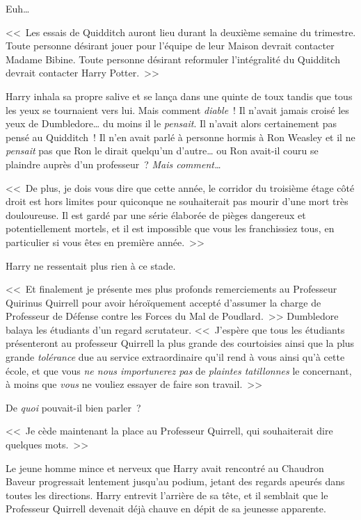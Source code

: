 Euh…

<<~Les essais de Quidditch auront lieu durant la deuxième semaine du trimestre. Toute personne désirant jouer pour l'équipe de leur Maison devrait contacter Madame Bibine. Toute personne désirant reformuler l'intégralité du Quidditch devrait contacter Harry Potter.~>>

Harry inhala sa propre salive et se lança dans une quinte de toux tandis que tous les yeux se tournaient vers lui. Mais comment \emph{diable}~! Il n'avait jamais croisé les yeux de Dumbledore… du moins il le \emph{pensait}. Il n'avait alors certainement pas pensé au Quidditch~! Il n'en avait parlé à personne hormis à Ron Weasley et il ne \emph{pensait} pas que Ron le dirait quelqu'un d'autre… ou Ron avait-il couru se plaindre auprès d'un professeur~? \emph{Mais comment…}

<<~De plus, je dois vous dire que cette année, le corridor du troisième étage côté droit est hors limites pour quiconque ne souhaiterait pas mourir d'une mort très douloureuse. Il est gardé par une série élaborée de pièges dangereux et potentiellement mortels, et il est impossible que vous les franchissiez tous, en particulier si vous êtes en première année.~>>

Harry ne ressentait plus rien à ce stade.

<<~Et finalement je présente mes plus profonds remerciements au Professeur Quirinus Quirrell pour avoir héroïquement accepté d'assumer la charge de Professeur de Défense contre les Forces du Mal de Poudlard.~>> Dumbledore balaya les étudiants d'un regard scrutateur. <<~J'espère que tous les étudiants présenteront au professeur Quirrell la plus grande des courtoisies ainsi que la plus grande \emph{tolérance} due au service extraordinaire qu'il rend à vous ainsi qu'à cette école, et que vous \emph{ne nous importunerez pas} de \emph{plaintes tatillonnes} le concernant, à moins que \emph{vous} ne vouliez essayer de faire son travail.~>>

De \emph{quoi} pouvait-il bien parler~?

<<~Je cède maintenant la place au Professeur Quirrell, qui souhaiterait dire quelques mots.~>>

Le jeune homme mince et nerveux que Harry avait rencontré au Chaudron Baveur progressait lentement jusqu'au podium, jetant des regards apeurés dans toutes les directions. Harry entrevit l'arrière de sa tête, et il semblait que le Professeur Quirrell devenait déjà chauve en dépit de sa jeunesse apparente.


